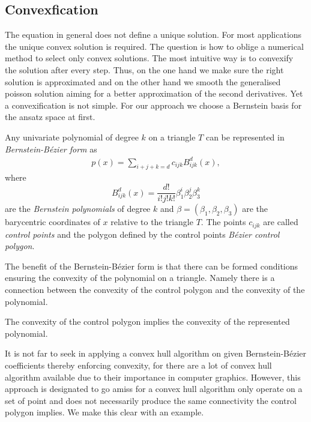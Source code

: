 \subsection{Convexfication}
The \MA equation in general does not define a unique solution. For most applications the unique convex solution is required. The question is how to oblige a numerical method to select only convex solutions.
The most intuitive way is to convexify the solution after every step. Thus, on the one hand we make sure the right solution is approximated and on the other hand we smooth the generalised poisson solution aiming for a better approximation of the second derivatives.
Yet a convexification is not simple. For our approach we choose a Bernstein basis for the ansatz space at first.
\begin{definition}\label{def: BernsteinBezierForm}
	Any univariate polynomial of degree $k$ on a triangle $T$ can be represented in \emph{Bernstein-B\'ezier form} as
\begin{align}
	p(x) = \sum_{i+j+k = d}  c_{ijk} B^d_{ijk}(x),\label{eq: BernsteinBezierForm}
\end{align}
where
\[
	B^d_{ijk}(x) = \frac {d!}{i!j!k!} \beta_1^i \beta_2^j \beta_3^k
\]
are the \emph{Bernstein polynomials} of degree $k$ and $\beta = (\beta_1, \beta_2, \beta_3)$ are the barycentric coordinates of $x$ relative to the triangle $T$.
The points $c_{ijk}$ are called \emph{control points} and the polygon defined by the control points \emph{B\'ezier control polygon}.
\end{definition}

The benefit of the Bernstein-B\'ezier form is that there can be formed conditions ensuring the convexity of the polynomial on a triangle. Namely there is a connection between the convexity of the control polygon and the convexity of the polynomial.
\begin{theorem}
	The convexity of the control polygon implies the convexity of the represented polynomial.
\end{theorem}
It is not far to seek in applying a convex hull algorithm on given Bernstein-B\'ezier coefficients thereby enforcing convexity, for there are a lot of convex hull algorithm available due to their importance in computer graphics. However, this approach is designated to go amiss for a convex hull algorithm only operate on a set of point and does not necessarily produce the same connectivity the control polygon implies. We make this clear with an example.

